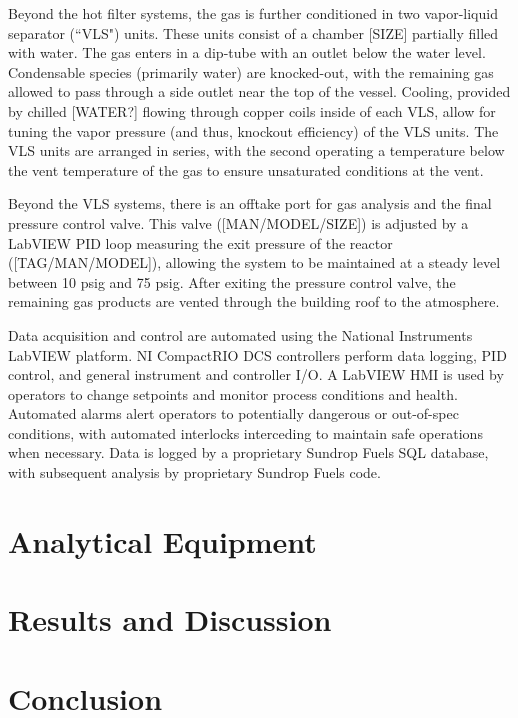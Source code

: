 \documentclass[11pt,twocolumn]{article}
\begin{document}
Beyond the hot filter systems, the gas is further conditioned in two vapor-liquid separator (``VLS") units.  These units consist of a chamber [SIZE] partially filled with water.  The gas enters in a dip-tube with an outlet below the water level.  Condensable species (primarily water) are knocked-out, with the remaining gas allowed to pass through a side outlet near the top of the vessel.  Cooling, provided by chilled [WATER?] flowing through copper coils inside of each VLS, allow for tuning the vapor pressure (and thus, knockout efficiency) of the VLS units.  The VLS units are arranged in series, with the second operating a temperature below the vent temperature of the gas to ensure unsaturated conditions at the vent.

Beyond the VLS systems, there is an offtake port for gas analysis and the final pressure control valve.  This valve ([MAN/MODEL/SIZE]) is adjusted by a LabVIEW PID loop measuring the exit pressure of the reactor ([TAG/MAN/MODEL]), allowing the system to be maintained at a steady level between 10 psig and 75 psig.  After exiting the pressure control valve, the remaining gas products are vented through the building roof to the atmosphere.

Data acquisition and control are automated using the National Instruments LabVIEW platform.  NI CompactRIO DCS controllers perform data logging, PID control, and general instrument and controller I/O.  A LabVIEW HMI is used by operators to change setpoints and monitor process conditions and health.  Automated alarms alert operators to potentially dangerous or out-of-spec conditions, with automated interlocks interceding to maintain safe operations when necessary.  Data is logged by a proprietary Sundrop Fuels SQL database, with subsequent analysis by proprietary Sundrop Fuels code.

\section*{Analytical Equipment}

 


\section*{Results and Discussion}



\section*{Conclusion}



\newpage
\appendix
\onecolumn
\end{document}
